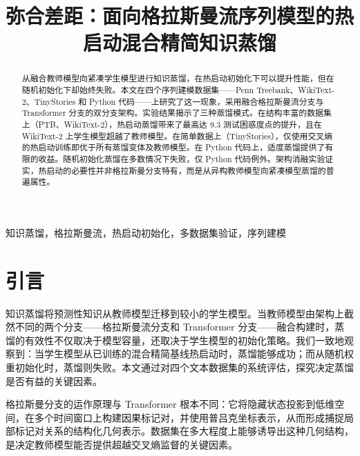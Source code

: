 \documentclass[conference]{IEEEtran}
\newcommand{\orcidID}[1]{\textsuperscript{\small\textregistered}}
\begin{document}
\title{弥合差距：面向格拉斯曼流序列模型的热启动混合精简知识蒸馏}

\author{\IEEEauthorblockN{宋鑫\orcidID{0009-0009-2497-9106}}
\and
\IEEEauthorblockN{吴涛\orcidID{0000-0001-5245-3800}}
}

\maketitle

\begin{abstract}
从融合教师模型向紧凑学生模型进行知识蒸馏，在热启动初始化下可以提升性能，但在随机初始化下却始终失败。本文在四个序列建模数据集——Penn Treebank、WikiText-2、TinyStories 和 Python 代码——上研究了这一现象，采用融合格拉斯曼流分支与 Transformer 分支的双分支架构。实验结果揭示了三种蒸馏模式。在结构丰富的数据集上（PTB、WikiText-2），热启动蒸馏带来了最高达 9.3 测试困惑度点的提升，且在 WikiText-2 上学生模型超越了教师模型。在简单数据上（TinyStories），仅使用交叉熵的热启动训练即优于所有蒸馏变体及教师模型。在 Python 代码上，适度蒸馏提供了有限的收益。随机初始化蒸馏在多数情况下失败，仅 Python 代码例外。架构消融实验证实，热启动的必要性并非格拉斯曼分支特有，而是从异构教师模型向紧凑模型蒸馏的普遍属性。
\end{abstract}

\begin{IEEEkeywords}
知识蒸馏，格拉斯曼流，热启动初始化，多数据集验证，序列建模
\end{IEEEkeywords}

\section{引言}

知识蒸馏将预测性知识从教师模型迁移到较小的学生模型\cite{hinton2015distilling,gou2021knowledge}。当教师模型由架构上截然不同的两个分支——格拉斯曼流分支和 Transformer 分支——融合构建时，蒸馏的有效性不仅取决于模型容量，还取决于学生模型的初始化策略。我们一致地观察到：当学生模型从已训练的混合精简基线热启动时，蒸馏能够成功；而从随机权重初始化时，蒸馏则失败。本文通过对四个文本数据集的系统评估，探究决定蒸馏是否有益的关键因素。

格拉斯曼分支的运作原理与 Transformer 根本不同\cite{vaswani2017attention,gu2023mamba,gu2022s4}：它将隐藏状态投影到低维空间，在多个时间窗口上构建因果标记对，并使用普吕克坐标表示\cite{zhang2025attentionnot}，从而形成捕捉局部标记对关系的结构化几何表示。数据集在多大程度上能够诱导出这种几何结构，是决定教师模型能否提供超越交叉熵监督的关键因素。
\end{document}
